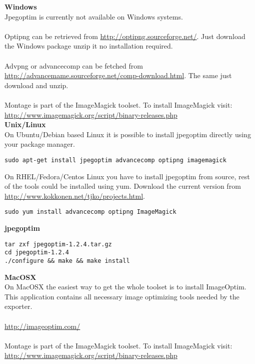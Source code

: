 \noindent \textbf{Windows}\\
\noindent Jpegoptim is currently not available on Windows systems.\\
\\
Optipng can be retrieved from \mbox{\url{http://optipng.sourceforge.net/}}. Just download the Windows package unzip it no installation required.\\
\\
Advpng or advancecomp can be fetched from \mbox{\url{http://advancemame.sourceforge.net/comp-download.html}}. The same just download and unzip.\\
\\
Montage is part of the ImageMagick toolset. To install ImageMagick visit:\\
\mbox{\url{http://www.imagemagick.org/script/binary-releases.php}} \\


\noindent \textbf{Unix/Linux}\\
\noindent On Ubuntu/Debian based Linux it is possible to install jpegoptim directly using your package manager.\\


\begin{verbatim}
sudo apt-get install jpegoptim advancecomp optipng imagemagick
\end{verbatim}

\noindent
On RHEL/Fedora/Centos Linux you have to install jpegoptim from source, rest of the tools could be installed using yum. Download the current version from \url{http://www.kokkonen.net/tjko/projects.html}. \\


\begin{verbatim}
sudo yum install advancecomp optipng ImageMagick
\end{verbatim}

\noindent \textbf{jpegoptim}
\begin{verbatim}
tar zxf jpegoptim-1.2.4.tar.gz
cd jpegoptim-1.2.4
./configure && make && make install
\end{verbatim}


\noindent \textbf{MacOSX}\\
\noindent On MacOSX the easiest way to get the whole toolset is to install ImageOptim. This application contains all necessary image optimizing tools needed by the exporter.\\
\\
\url{http://imageoptim.com/}\\
\\
Montage is part of the ImageMagick toolset. To install ImageMagick visit:\\
\url{http://www.imagemagick.org/script/binary-releases.php}\\


